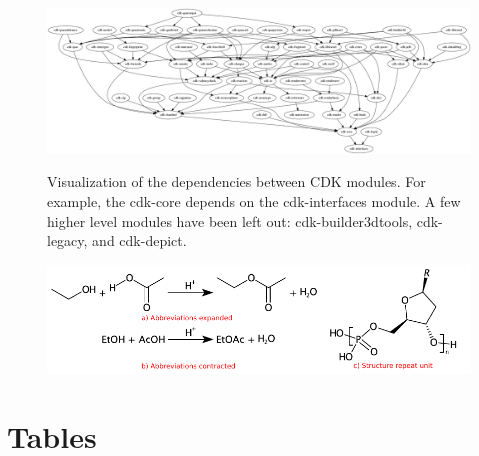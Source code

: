 \documentclass[10pt]{bmcart}
\begin{document}
\begin{backmatter}
\begin{figure}[h!]
  \caption{
    Visualization of the dependencies between CDK modules. For example,
    the cdk-core depends on the cdk-interfaces module. A few higher level
    modules have been left out: cdk-builder3dtools, cdk-legacy, and
    cdk-depict.}
  \centering
  \includegraphics[width=\textwidth]{cdkDeps.png}
  \label{fig:deps}
\end{figure}

\begin{figure}[h!]
  \caption{}
  \includegraphics[width=\textwidth]{img/sgroups.pdf}
  \label{fig:sgroups}
\end{figure}
      





\clearpage

\section*{Tables}



\end{backmatter}
\end{document}
